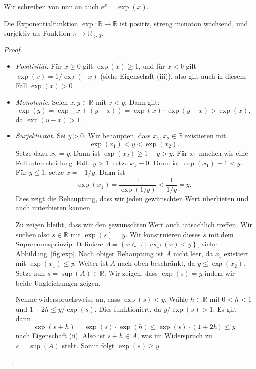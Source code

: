 \documentclass[../main.tex]{subfiles}
\begin{document}
\begin{notation}
  Wir schreiben von nun an auch
  \(
    e^x = \exp(x).
  \)
\end{notation}

\begin{proposition*}
  Die Exponentialfunktion $\exp \colon \mathbb{R} \to \mathbb{R}$ 
  ist positiv, streng monoton wachsend, und surjektiv
  als Funktion $\mathbb{R} \to \mathbb{R}_{>0}$.
\end{proposition*}

\begin{proof}
  \leavevmode
  \begin{itemize}
    \item \emph{Positivität}. 
      Für $x \geq 0$ gilt $\exp(x) \geq 1$,
      und für $x < 0 $ gilt $\exp(x) = 1/\exp(-x)$
      (siehe Eigenschaft (iii)), also gilt
      auch in diesem Fall
      $\exp(x) > 0$.
    \item \emph{Monotonie}. 
      Seien $x, y \in \mathbb{R}$ mit $x < y$.
      Dann gilt:
      \[
        \exp(y) = \exp(x + (y - x))
        = \exp(x) \cdot \exp(y-x)
        > \exp(x),
      \]
      da $\exp(y-x) > 1$.
    \item \emph{Surjektivität}.
      Sei $y > 0$. Wir behaupten,
      dass $x_1, x_2 \in \mathbb{R}$ existieren mit 
      \[
        \exp(x_1) < y < \exp(x_2).
      \]
      Setze dazu $x_2 = y$. Dann ist
        $\exp(x_2) \geq 1 + y > y$.
      Für $x_1$ machen wir eine Fallunterscheidung.
      Falls $y > 1$, setze $x_1 = 0$. Dann ist
      $\exp(x_1) = 1 < y$. Für $y \leq 1$, setze
      $x = -1/y$. Dann ist
       \[
         \exp(x_1) = \frac{1}{\exp(1/y)} < \frac{1}{1/y} = y.
      \]
      Dies zeigt die Behauptung, dass wir jeden gewünschten
      Wert überbieten und auch unterbieten können.

      Zu zeigen bleibt, dass wir den gewünschten Wert auch
      tatsächlich treffen.
      Wir suchen also $s \in \mathbb{R}$ mit $\exp(s) = y$.
      Wir konstruieren dieses $s$ mit dem Supremumsprinzip.
      Definiere
      $A = \left\{x \in \mathbb{R} \mid \exp(x) \leq y\right\}$,
      siehe Abbildung~\ref{fig:exp}.
      Nach obiger Behauptung ist $A$ nicht leer,
      da $x_1$ existiert mit $\exp(x_1) \leq y$.
      Weiter ist $A$ nach oben beschränkt,
      da $y \leq \exp(x_2)$.
      Setze nun $s = \sup(A) \in \mathbb{R}$.
      Wir zeigen, dass $\exp(s) = y$ indem wir
      beide Ungleichungen zeigen.

      Nehme widerspruchsweise an, dass $\exp(s) < y$.
      Wähle $h \in \mathbb{R}$ mit $0 < h < 1$
      und $1 + 2h \leq y/\exp(s)$.
      Dies funktioniert, da $y/\exp(s) > 1$.
      Es gilt dann
       \[
         \exp(s + h) = \exp(s) \cdot \exp(h) \leq \exp(s)
         \cdot (1 + 2h) \leq y
      \]
      nach Eigenschaft (ii).
      Also ist $s + h \in A$, was im Widerspruch zu
      $s = \sup(A)$ steht.
      Somit folgt $\exp(s) \geq y$.
      

\end{itemize}
\end{proof}
\end{document}
